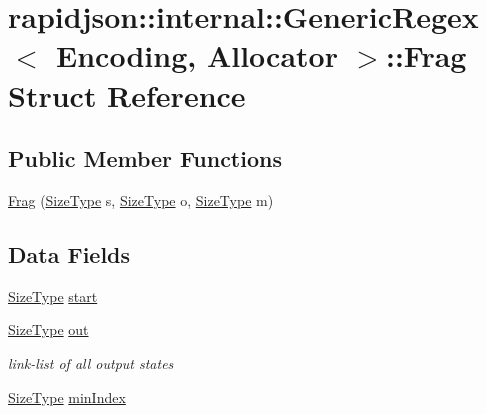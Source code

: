 \hypertarget{structrapidjson_1_1internal_1_1_generic_regex_1_1_frag}{}\section{rapidjson\+::internal\+::Generic\+Regex$<$ Encoding, Allocator $>$\+::Frag Struct Reference}
\label{structrapidjson_1_1internal_1_1_generic_regex_1_1_frag}
\subsection*{Public Member Functions}
\begin{DoxyCompactItemize}
\item 
\mbox{\hyperlink{structrapidjson_1_1internal_1_1_generic_regex_1_1_frag_a4c77c5aef6eba12caecc5f3cd107a952}{Frag}} (\mbox{\hyperlink{namespacerapidjson_a44eb33eaa523e36d466b1ced64b85c84}{Size\+Type}} s, \mbox{\hyperlink{namespacerapidjson_a44eb33eaa523e36d466b1ced64b85c84}{Size\+Type}} o, \mbox{\hyperlink{namespacerapidjson_a44eb33eaa523e36d466b1ced64b85c84}{Size\+Type}} m)
\end{DoxyCompactItemize}
\subsection*{Data Fields}
\begin{DoxyCompactItemize}
\item 
\mbox{\hyperlink{namespacerapidjson_a44eb33eaa523e36d466b1ced64b85c84}{Size\+Type}} \mbox{\hyperlink{structrapidjson_1_1internal_1_1_generic_regex_1_1_frag_a4d212cb7efd36239da71c6a283c83218}{start}}
\item 
\mbox{\hyperlink{namespacerapidjson_a44eb33eaa523e36d466b1ced64b85c84}{Size\+Type}} \mbox{\hyperlink{structrapidjson_1_1internal_1_1_generic_regex_1_1_frag_ac9726f690300c0d4f7c67831be620da4}{out}}
\begin{DoxyCompactList}\small\item\em link-\/list of all output states \end{DoxyCompactList}\item 
\mbox{\hyperlink{namespacerapidjson_a44eb33eaa523e36d466b1ced64b85c84}{Size\+Type}} \mbox{\hyperlink{structrapidjson_1_1internal_1_1_generic_regex_1_1_frag_abacffb8ade2286c0073a5cf0069399e7}{min\+Index}}
\end{DoxyCompactItemize}


